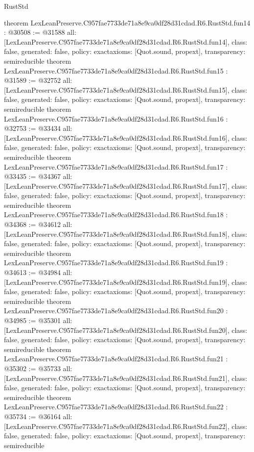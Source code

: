 \begin{lexlean}{RustStd}
\begin{coremodule}
{}
theorem LexLeanPreserve.C957fae7733de71a8e9ca0df28d31cdad.R6.RustStd.fun14 : @30508 := @31588 {
  all: [LexLeanPreserve.C957fae7733de71a8e9ca0df28d31cdad.R6.RustStd.fun14],
  class: false,
  generated: false,
  policy: exact{axioms: [Quot.sound, propext]},
  transparency: semireducible
}
theorem LexLeanPreserve.C957fae7733de71a8e9ca0df28d31cdad.R6.RustStd.fun15 : @31589 := @32752 {
  all: [LexLeanPreserve.C957fae7733de71a8e9ca0df28d31cdad.R6.RustStd.fun15],
  class: false,
  generated: false,
  policy: exact{axioms: [Quot.sound, propext]},
  transparency: semireducible
}
theorem LexLeanPreserve.C957fae7733de71a8e9ca0df28d31cdad.R6.RustStd.fun16 : @32753 := @33434 {
  all: [LexLeanPreserve.C957fae7733de71a8e9ca0df28d31cdad.R6.RustStd.fun16],
  class: false,
  generated: false,
  policy: exact{axioms: [Quot.sound, propext]},
  transparency: semireducible
}
theorem LexLeanPreserve.C957fae7733de71a8e9ca0df28d31cdad.R6.RustStd.fun17 : @33435 := @34367 {
  all: [LexLeanPreserve.C957fae7733de71a8e9ca0df28d31cdad.R6.RustStd.fun17],
  class: false,
  generated: false,
  policy: exact{axioms: [Quot.sound, propext]},
  transparency: semireducible
}
theorem LexLeanPreserve.C957fae7733de71a8e9ca0df28d31cdad.R6.RustStd.fun18 : @34368 := @34612 {
  all: [LexLeanPreserve.C957fae7733de71a8e9ca0df28d31cdad.R6.RustStd.fun18],
  class: false,
  generated: false,
  policy: exact{axioms: [Quot.sound, propext]},
  transparency: semireducible
}
theorem LexLeanPreserve.C957fae7733de71a8e9ca0df28d31cdad.R6.RustStd.fun19 : @34613 := @34984 {
  all: [LexLeanPreserve.C957fae7733de71a8e9ca0df28d31cdad.R6.RustStd.fun19],
  class: false,
  generated: false,
  policy: exact{axioms: [Quot.sound, propext]},
  transparency: semireducible
}
theorem LexLeanPreserve.C957fae7733de71a8e9ca0df28d31cdad.R6.RustStd.fun20 : @34985 := @35301 {
  all: [LexLeanPreserve.C957fae7733de71a8e9ca0df28d31cdad.R6.RustStd.fun20],
  class: false,
  generated: false,
  policy: exact{axioms: [Quot.sound, propext]},
  transparency: semireducible
}
theorem LexLeanPreserve.C957fae7733de71a8e9ca0df28d31cdad.R6.RustStd.fun21 : @35302 := @35733 {
  all: [LexLeanPreserve.C957fae7733de71a8e9ca0df28d31cdad.R6.RustStd.fun21],
  class: false,
  generated: false,
  policy: exact{axioms: [Quot.sound, propext]},
  transparency: semireducible
}
theorem LexLeanPreserve.C957fae7733de71a8e9ca0df28d31cdad.R6.RustStd.fun22 : @35734 := @36164 {
  all: [LexLeanPreserve.C957fae7733de71a8e9ca0df28d31cdad.R6.RustStd.fun22],
  class: false,
  generated: false,
  policy: exact{axioms: [Quot.sound, propext]},
  transparency: semireducible
}
\end{coremodule}
\end{lexlean}
